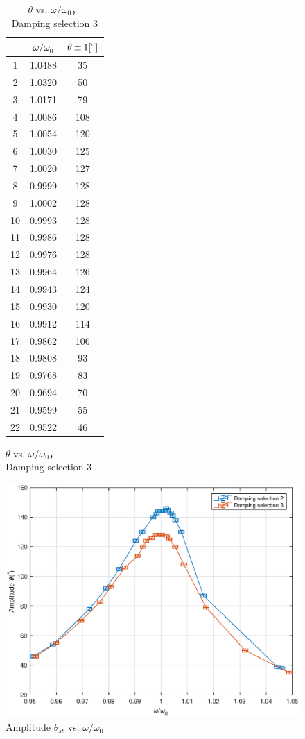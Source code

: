 \begin{figure}
\begin{minipage}{0.45\textwidth}
\begin{table}[H]
\centering
\begin{tabular}{|c|c|c|}
\hline
& $\omega/\omega_0$ &  $\theta \pm 1 [^\circ] $ \\ \hline
1  & 1.0488   & 35   \\ \hline
2  & 1.0320   & 50   \\ \hline
3  & 1.0171   & 79   \\ \hline
4  & 1.0086   & 108  \\ \hline
5  & 1.0054   & 120  \\ \hline
6  & 1.0030   & 125  \\ \hline
7  & 1.0020   & 127  \\ \hline
8  & 0.9999   & 128  \\ \hline
9  & 1.0002   & 128  \\ \hline
10 & 0.9993   & 128  \\ \hline
11 & 0.9986   & 128  \\ \hline
12 & 0.9976   & 128  \\ \hline
13 & 0.9964   & 126  \\ \hline
14 & 0.9943   & 124  \\ \hline
15 & 0.9930   & 120  \\ \hline
16 & 0.9912   & 114  \\ \hline
17 & 0.9862   & 106  \\ \hline
18 & 0.9808   & 93   \\ \hline
19 & 0.9768   & 83   \\ \hline
20 & 0.9694   & 70   \\ \hline
21 & 0.9599   & 55   \\ \hline
22 & 0.9522   & 46   \\ \hline
\end{tabular}    
\caption{$\theta$ vs. $\omega/\omega_0$，\\ Damping selection 3}\label{data_t3}
\end{table}
\end{minipage}
\vspace*{5cm}
\end{figure}

\begin{figure}[H]
\centering
\includegraphics[width=1\textwidth]{matlab/p2}
\caption{Amplitude $\theta_{st}$ vs. $\omega/\omega_0$}
\label{theta}
\end{figure}